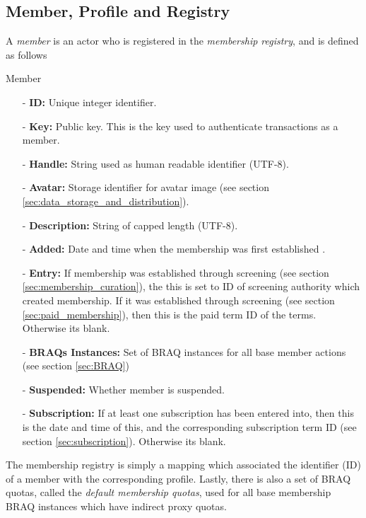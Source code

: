 \documentclass{article}
\newenvironment{concept_box}[1]
    {
    \begin{tcolorbox}
    {\large \textbf{#1} }
    }
    {
    \end{tcolorbox}
    }
\begin{document}
\subsection{Member, Profile and Registry} \label{sec:member_profile}

A \textit{member} is an actor who is registered in the \textit{membership registry}, and is defined as follows \\

\begin{concept_box}{Member}
    \begin{itemize}
      \item[-] \textbf{ID:} Unique integer identifier.
      \item[-] \textbf{Key:} Public key. This is the key used to authenticate transactions as a member. %
      \item[-] \textbf{Handle:} String used as human readable identifier (UTF-8).
      \item[-] \textbf{Avatar:} Storage identifier for avatar image (see section \ref{sec:data_storage_and_distribution}).
      \item[-] \textbf{Description:} String of capped length (UTF-8).

      \item[-] \textbf{Added:} Date and time when the membership was first established .
      \item[-] \textbf{Entry:} If membership was established through screening (see section \ref{sec:membership_curation}), the this is set to ID of screening authority which created membership. If it was established through screening (see section \ref{sec:paid_membership}), then this is the paid term ID of the terms. Otherwise its blank.
      \item[-] \textbf{BRAQs Instances:} Set of BRAQ instances for all base member actions (see section \ref{sec:BRAQ})
      \item[-] \textbf{Suspended:} Whether member is suspended.
      \item[-] \textbf{Subscription:} If at least one subscription has been entered into, then this is the date and time of this, and the corresponding subscription term ID (see section \ref{sec:subscription}). Otherwise its blank.
    \end{itemize}
\end{concept_box}

The membership registry is simply a mapping which associated the identifier (ID) of a member with the corresponding profile. Lastly, there is also a set of BRAQ quotas, called the \textit{default membership quotas}, used for all base membership BRAQ instances which have indirect proxy quotas.
\end{document}
